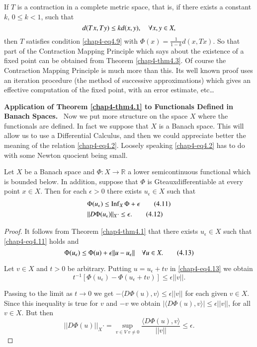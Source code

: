 \begin{remark*}
If $T$ is a contraction in a complete metric space, that is, if there
exists a constant $k$, $0\leq k<1$, such that
$$
d(Tx,Ty)\leq kd(x,y),\quad \forall x, y\in X,
$$
then $T$ satisfies condition \eqref{chap4-eq4.9} with
$\Phi(x)=\frac{1}{1-k}d(x,Tx)$. So that part of the Contraction
Mapping Principle which says about the existence of a fixed point can
be obtained from Theorem \ref{chap4-thm4.3}. Of course the Contraction
Mapping Principle is much more than this. Its well known proof uses an
iteration procedure (the method of successive approximations) which
gives an effective computation of the fixed point, with an error
estimate, etc\ldots
\end{remark*}

\medskip
\noindent
{\bf Application of Theorem \ref{chap4-thm4.1} to Functionals Defined
  in Banach Spa\-ces.}~ Now we put more structure on the space $X$ where
the functionals are defined. In fact we suppose that $X$ is a Banach
space. This will allow us to use a Differential Calculus, and then we
could appreciate better the meaning of the relation
\eqref{chap4-eq4.2}. Loosely speaking \eqref{chap4-eq4.2} has to do
with some Newton quocient being small.

\begin{theorem}\label{chap4-thm4.4}
Let $X$ be a Banach space and $\Phi:X\to \mathbb{R}$ a lower
semicontinuous functional which is bounded below. In addition, suppose
that $\Phi$ is Gteaux\pageoriginale differentiable at every point
$x\in X$. Then for each $\epsilon>0$ there exists $u_{\epsilon}\in X$
such that
\begin{align*}
&\Phi(u_{\epsilon})\leq
  \operatorname{Inf}_{X}\Phi+\epsilon\tag{4.11}\label{chap4-eq4.11}\\
&||D\Phi(u_{\epsilon})||_{X}\cdot \leq
  \epsilon.\tag{4.12}\label{chap4-eq4.12} 
\end{align*}
\end{theorem}

\begin{proof}
It follows from Theorem \ref{chap4-thm4.1} that there exists
$u_{\epsilon}\in X$ such that \eqref{chap4-eq4.11} holds and
\begin{equation*}
\Phi(u_{\epsilon})\leq \Phi(u)+\epsilon||u-u_{\epsilon}||\quad \forall
u\in X.\tag{4.13}\label{chap4-eq4.13} 
\end{equation*}

Let $v\in X$ and $t>0$ be arbitrary. Putting $u=u_{\epsilon}+tv$ in
\eqref{chap4-eq4.13} we obtain
$$
t^{-1}[\Phi(u_{\epsilon})-\Phi(u_{\epsilon}+tv)]\leq \epsilon||v||.
$$

Passing to the limit as $t\to 0$ we get $-\langle D\Phi(u),v\rangle
\leq \epsilon||v||$ for each given $v\in X$. Since this inequality is
true for $v$ and $-v$ we obtain $|\langle D\Phi(u),v\rangle|\leq
\epsilon||v||$, for all $v\in X$. But then
$$
||D\Phi(u)||_{X}\cdot =\sup\limits_{v\in V\ v\neq 0}\frac{\langle
  D\Phi(u),v\rangle}{||v||}\leq \epsilon.
$$
\end{proof}


